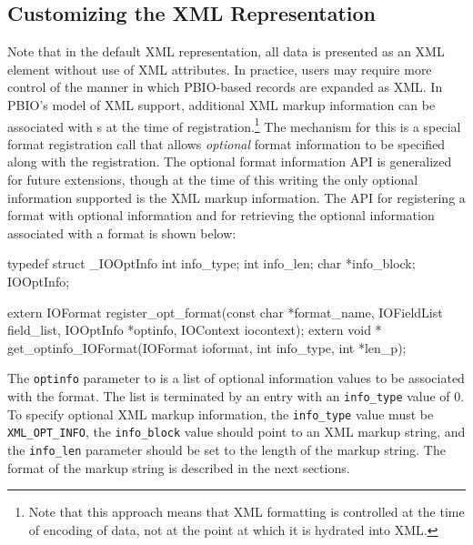 \subsection{Customizing the XML Representation}
Note that in the default XML representation, all data is presented as an XML
element without use of XML attributes.  In practice, users may require more
control of the manner in which PBIO-based records are expanded as XML.
In PBIO's model of XML support, additional XML markup information can be
associated with s at the time of
registration.\footnote{Note that this approach means that XML formatting is
controlled at the time of encoding of data, not at the point at which it is
hydrated into XML.}  The mechanism for this is a special format registration
call that allows {\it optional} format information to be specified along
with the registration.  The optional format information API is generalized
for future extensions, though at the time of this writing the only optional
information supported is the XML markup information.  The API for registering a format with
optional information and for retrieving the optional information associated
with a format is shown below:
\begin{Code}
typedef struct _IOOptInfo {
    int info_type;
    int info_len;
    char *info_block;
} IOOptInfo;

extern IOFormat register_opt_format(const char *format_name, IOFieldList field_list,
				    IOOptInfo *optinfo, IOContext iocontext);
extern void * get_optinfo_IOFormat(IOFormat ioformat, int info_type, int *len_p);
\end{Code}
The {\tt optinfo} parameter to  is a list
of optional information values to be associated with the format.  The list
is terminated by an entry with an {\tt info\_type} value of 0.  To specify
optional XML markup information, the {\tt info\_type} value must be {\tt
XML\_OPT\_INFO}, the {\tt info\_block} value should point to an XML markup
string, and the {\tt info\_len} parameter should be set to the length of the
markup string.  The format of the markup string is described in the next
sections.

